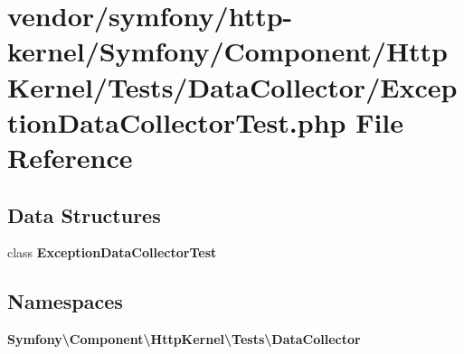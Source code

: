 \section{vendor/symfony/http-\/kernel/\+Symfony/\+Component/\+Http\+Kernel/\+Tests/\+Data\+Collector/\+Exception\+Data\+Collector\+Test.php File Reference}
\label{_exception_data_collector_test_8php}
\subsection*{Data Structures}
\begin{DoxyCompactItemize}
\item 
class {\bf Exception\+Data\+Collector\+Test}
\end{DoxyCompactItemize}
\subsection*{Namespaces}
\begin{DoxyCompactItemize}
\item 
 {\bf Symfony\textbackslash{}\+Component\textbackslash{}\+Http\+Kernel\textbackslash{}\+Tests\textbackslash{}\+Data\+Collector}
\end{DoxyCompactItemize}
